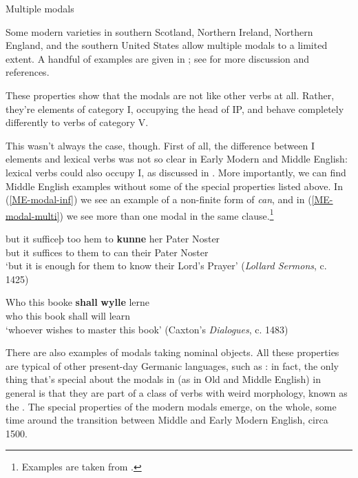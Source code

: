 \begin{syntaxbox}{Multiple modals}

Some modern varieties in southern Scotland, Northern Ireland, Northern England, and the southern United States allow multiple modals to a limited extent. A handful of examples are given in ; see \citet{Huang2011} for more discussion and references.
\end{syntaxbox}


\noindent These properties show that the modals are not like other verbs at all. Rather, they're elements of category I, occupying the head of IP, and behave completely differently to verbs of category V.

This wasn't always the case, though. First of all, the difference between I elements and lexical verbs was not so clear in Early Modern and Middle English: lexical verbs could also occupy I, as discussed in . More importantly, we can find Middle English examples without some of the special properties listed above. In (\ref{ME-modal-inf}) we see an example of a non-finite form of \emph{can}, and in (\ref{ME-modal-multi}) we see more than one modal in the same clause.\footnote{Examples are taken from \citet[310]{Denison1993}.}

\begin{exe}
\ex
\gll but it sufficeþ too hem to \textbf{kunne} her Pater Noster\\
but it suffices to them to can their Pater Noster\\
\trans `but it is enough for them to know their Lord's Prayer' \hfill (\emph{Lollard Sermons}, c. 1425)
\label{ME-modal-inf}
\end{exe}

\begin{exe}
\ex
\gll Who this booke \textbf{shall} \textbf{wylle} lerne\\
who this book shall will learn\\
\trans `whoever wishes to master this book' \hfill (Caxton's \emph{Dialogues}, c. 1483)
\label{ME-modal-multi}
\end{exe}

\noindent There are also examples of modals taking nominal objects. All these properties are typical of other present-day Germanic languages, such as : in fact, the only thing that's special about the modals in  (as in Old and Middle English) in general is that they are part of a class of verbs with weird morphology, known as the . The special properties of the modern modals emerge, on the whole, some time around the transition between Middle and Early Modern English, circa 1500.

